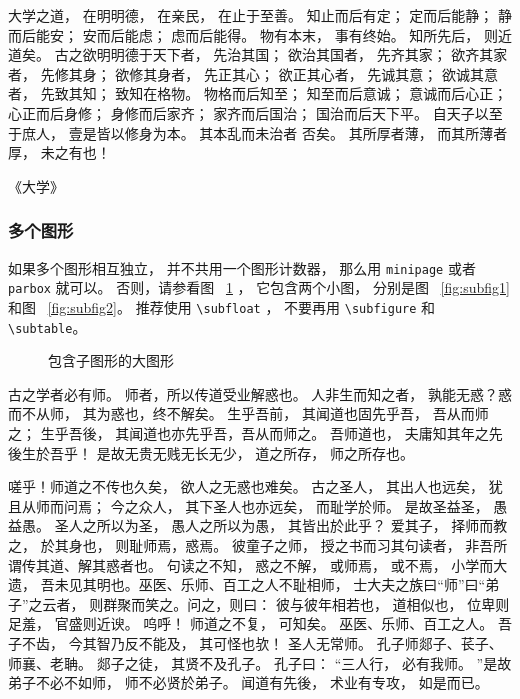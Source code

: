 大学之道，
在明明德，
在亲民，
在止于至善。
知止而后有定；
定而后能静；
静而后能安；
安而后能虑；
虑而后能得。
物有本末，
事有终始。
知所先后，
则近道矣。
古之欲明明德于天下者，
先治其国；
欲治其国者，
先齐其家；
欲齐其家者，
先修其身；
欲修其身者，
先正其心；
欲正其心者，
先诚其意；
欲诚其意者，
先致其知；
致知在格物。
物格而后知至；
知至而后意诚；
意诚而后心正；
心正而后身修；
身修而后家齐；
家齐而后国治；
国治而后天下平。
自天子以至于庶人，
壹是皆以修身为本。
其本乱而未治者 否矣。
其所厚者薄，
而其所薄者厚，
未之有也！

\hfill \pozhehao《大学》


\subsubsection{多个图形}
\label{subsubsection:multifig}

如果多个图形相互独立，
并不共用一个图形计数器，
那么用 \verb|minipage| 或者\verb|parbox| 就可以。
否则，请参看图 ~\ref{fig:big1} ，
它包含两个小图，
分别是图 ~\ref{fig:subfig1} 和图 ~\ref{fig:subfig2}。
推荐使用 \verb|\subfloat| ，
不要再用 \verb|\subfigure| 和 \verb|\subtable|。
\begin{figure} %
  \centering%
  \hspace{4em}%
  \caption{包含子图形的大图形}
  \label{fig:big1}
\end{figure}

古之学者必有师。
师者，所以传道受业解惑也。
人非生而知之者，
孰能无惑？惑而不从师，
其为惑也，终不解矣。
生乎吾前，
其闻道也固先乎吾，
吾从而师之；
生乎吾後，
其闻道也亦先乎吾，吾从而师之。
吾师道也，
夫庸知其年之先後生於吾乎！
是故无贵无贱无长无少，
道之所存，
师之所存也。

嗟乎！师道之不传也久矣，
欲人之无惑也难矣。
古之圣人，
其出人也远矣，
犹且从师而问焉；
今之众人，
其下圣人也亦远矣，
而耻学於师。
是故圣益圣，
愚益愚。
圣人之所以为圣，
愚人之所以为愚，
其皆出於此乎？
爱其子，
择师而教之，
於其身也，
则耻师焉，惑焉。
彼童子之师，
授之书而习其句读者，
非吾所谓传其道、解其惑者也。
句读之不知，
惑之不解，
或师焉，
或不焉，
小学而大遗，
吾未见其明也。巫医、乐师、百工之人不耻相师，
士大夫之族曰“师”曰“弟子”之云者，
则群聚而笑之。问之，则曰：
彼与彼年相若也，
道相似也，
位卑则足羞，
官盛则近谀。
呜呼！
师道之不复，
可知矣。
巫医、乐师、百工之人。
吾子不齿，
今其智乃反不能及，
其可怪也欤！
圣人无常师。
孔子师郯子、苌子、师襄、老聃。
郯子之徒，
其贤不及孔子。
孔子曰：
“三人行，
必有我师。
”是故弟子不必不如师，
师不必贤於弟子。
闻道有先後，
术业有专攻，
如是而已。

